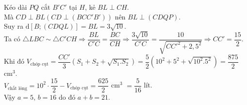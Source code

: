 \begin{ex}
{\begin{center}
		\end{center}
		Kéo dài $PQ$ cắt $B'C'$ tại $H$, kẻ $BL \perp CH$. \\
		Mà $CD \perp BL \left( CD \perp (BCC'B') \right)$ nên $BL \perp (CDQP)$. \\
		Suy ra $\mathrm{d}[B;(CDQL)] = BL = 3\sqrt{10}$. \\
		Ta có $\triangle LBC \sim \triangle C'CH \Rightarrow \dfrac{BL}{C'C} = \dfrac{BC}{CH} \Rightarrow \dfrac{3\sqrt{10}}{C'C} = \dfrac{10}{\sqrt{CC'^2 + 2{,}5^2}} \Rightarrow CC' = \dfrac{15}{2}.$ \\
		Khi đó $V_{\text{chóp cụt}} = \dfrac{CC'}{3} \left( S_1 + S_2 + \sqrt{S_1 . S_2} \right) = \dfrac{5}{2} \left( 10^2 + 5^2 + \sqrt{10^2 . 5^2} \right) = \dfrac{875}{2}$ cm$^3$.\\
		$V_{\text{chất lỏng}} = 10^2 \cdot \dfrac{15}{2} - V_{\text{chóp cụt}} = \dfrac{625}{2} $ cm$^3$ $= \dfrac{5}{16}$ lít. \\
		Vậy $a=5$, $b=16$ do đó $ a+b=21$.
	}
\end{ex}

